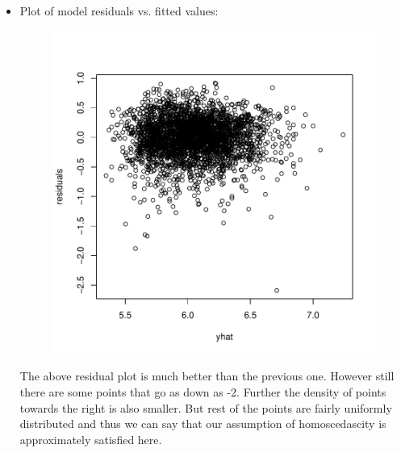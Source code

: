 \documentclass[12pt]{article}
\begin{document}
\begin{itemize}
\item Plot of model residuals vs. fitted values:
\begin{figure}[H]
\begin{Schunk}
\end{Schunk}
\includegraphics{HW3-039}
\end{figure}
The above residual plot is much better than the previous one. However still there are some points that go as down as -2. Further the density of points towards the right is also smaller. But rest of the points are fairly uniformly distributed and thus we can say that our assumption of homoscedascity is approximately satisfied here.

\clearpage


\end{itemize}
\end{document}
